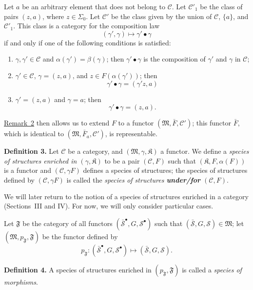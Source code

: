 \documentclass[a4paper,oneside,nobib,nofonts,notitlepage,notoc,nols,fleqn,justified]{tufte-book}
\newenvironment{rmenv}[1]
  {\phantomsection\par\medskip\noindent\textbf{#1.}\rmfamily}
  {\par\medskip}
\newcommand{\unsure}[1]{{\color{purple}\textbf{#1}}}
\newcommand{\CC}{\mathcal{C}}
\renewcommand{\SS}{\mathcal{S}}
\newcommand{\MM}{\mathfrak{M}}
\newcommand{\KK}{\mathfrak{K}}
\newcommand{\FF}{\mathfrak{F}}
\begin{document}
Let $a$ be an arbitrary element that does not belong to $\CC$.
Let $\CC'_1$ be the class of pairs $(z,a)$, where $z\in\Sigma_0$.
Let $\CC'$ be the class given by the union of $\CC$, $\{a\}$, and $\CC'_1$.
This class is a category for the composition law
\[
  (\gamma',\gamma)
  \longmapsto\gamma'\bullet\gamma
\]
if and only if one of the following conditions is satisfied:
\begin{enumerate}
  \item[\normalfont(1)]
    $\gamma,\gamma'\in\CC$ and $\alpha(\gamma')=\beta(\gamma)$;
    then $\gamma'\bullet\gamma$ is the composition of $\gamma'$ and $\gamma$ in $\CC$;
  \item[\normalfont(2)]
    $\gamma'\in\CC$, $\gamma=(z,a)$, and $z\in F(\alpha(\gamma'))$;
    then
    \[
      \gamma'\bullet\gamma
      =(\gamma'z,a)
    \]
  \item[\normalfont(3)]
    $\gamma'=(z,a)$ and $\gamma=a$;
    then
    \[
      \gamma'\bullet\gamma
      =(z,a).
    \]
\end{enumerate}
\hyperref[remark:2]{Remark~2} then allows us to extend $F$ to a functor $(\MM,\bar{F},\CC')$;
this functor $\bar{F}$, which is identical to $(\MM,\bar{F}_a,\CC')$, is representable.

\begin{rmenv}{Definition 3}
\label{definition:2}
  Let $\CC$ be a category, and $(\MM,\gamma,\KK)$ a functor.
  We define a \emph{species of structures enriched in $(\gamma,\KK)$} to be a pair $(\CC,F)$ such that $(\KK,F,\alpha(F))$ is a functor and $(\CC,\gamma F)$ defines a species of structures;
  the species of structures defined by $(\CC,\gamma F)$ is called the \emph{species of structures \unsure{under/for} $(\CC,F)$}.
\end{rmenv}

We will later return to the notion of a species of structures enriched in a category (Sections~III and IV).
For now, we will only consider particular cases.

Let $\FF$ be the category of all functors $(\bar{\SS}^\bullet,G,\SS^\bullet)$ such that $(\bar{\SS},G,\SS)\in\MM$;
let $(\MM,p_\FF,\FF)$ be the functor defined by
\[
  p_\FF\colon(\bar{\SS}^\bullet,G,\SS^\bullet)
  \longmapsto (\bar{\SS},G,\SS).
\]

\begin{rmenv}{Definition 4}
  A species of structures enriched in $(p_\FF,\FF)$ is called a \emph{species of morphisms}.
\end{rmenv}
\end{document}
